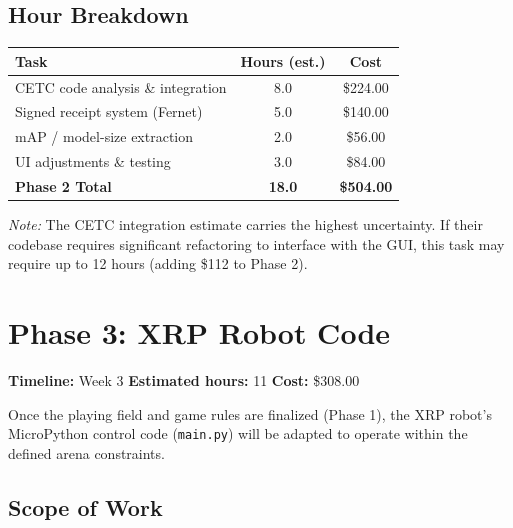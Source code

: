\documentclass[a4paper]{article}
\begin{document}
\subsection*{Hour Breakdown}

\begin{center}
\begin{tabular}{lcc}
\toprule
\textbf{Task} & \textbf{Hours (est.)} & \textbf{Cost} \\
\midrule
CETC code analysis \& integration & 8.0 & \$224.00 \\
Signed receipt system (Fernet) & 5.0 & \$140.00 \\
mAP / model-size extraction & 2.0 & \$56.00 \\
UI adjustments \& testing & 3.0 & \$84.00 \\
\midrule
\textbf{Phase 2 Total} & \textbf{18.0} & \textbf{\$504.00} \\
\bottomrule
\end{tabular}
\end{center}

\vspace{0.5em}
\noindent\textit{Note:} The CETC integration estimate carries the highest uncertainty. If their codebase requires significant refactoring to interface with the GUI, this task may require up to 12 hours (adding \$112 to Phase 2).

\section*{Phase 3: XRP Robot Code}

\noindent\textbf{Timeline:} Week 3 \hfill \textbf{Estimated hours:} 11 \hfill \textbf{Cost:} \$308.00

\vspace{0.5em}

Once the playing field and game rules are finalized (Phase 1), the XRP robot's MicroPython control code (\texttt{main.py}) will be adapted to operate within the defined arena constraints.

\subsection*{Scope of Work}
\end{document}
